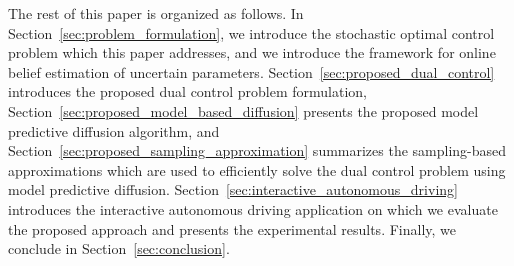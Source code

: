 \documentclass[letterpaper, 10 pt, conference]{IEEEconf}
\begin{document}
The rest of this paper is organized as follows.
In Section~\ref{sec:problem_formulation}, we introduce the stochastic optimal control problem which this paper addresses, and we introduce the framework for online belief estimation of uncertain parameters.
Section~\ref{sec:proposed_dual_control} introduces the proposed dual control problem formulation,
Section~\ref{sec:proposed_model_based_diffusion} presents the proposed model predictive diffusion algorithm, 
and Section~\ref{sec:proposed_sampling_approximation} summarizes the sampling-based approximations which are used to efficiently solve the dual control problem using model predictive diffusion.
Section~\ref{sec:interactive_autonomous_driving} introduces the interactive autonomous driving application on which we evaluate the proposed approach and presents the experimental results.
Finally, we conclude in Section~\ref{sec:conclusion}.


\end{document}

